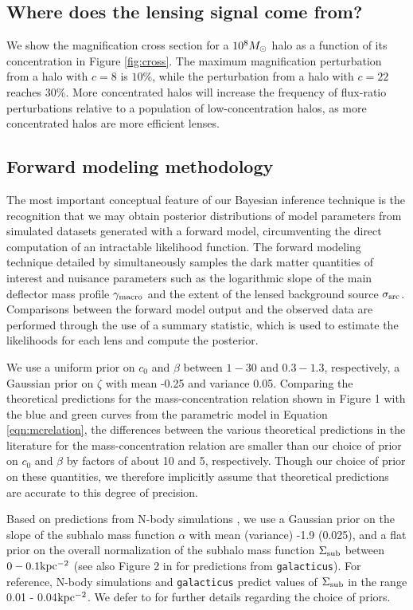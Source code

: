 \subsection{Where does the lensing signal come from?}

We show the magnification cross section for a $10^{8} {M_{\odot}}$ halo as a function of its concentration in Figure \ref{fig:cross}. The maximum magnification perturbation from a halo with $c=8$ is $10\%$, while the perturbation from a halo with $c = 22$ reaches $30 \%$. More concentrated halos will increase the frequency of flux-ratio perturbations relative to a population of low-concentration halos, as more concentrated halos are more efficient lenses. 

\subsection{Forward modeling methodology}
The most important conceptual feature of our Bayesian inference technique is the recognition that we may obtain posterior distributions of model parameters from simulated datasets generated with a forward model, circumventing the direct computation of an intractable likelihood function. The forward modeling technique detailed by \cite{Gilman++19b} simultaneously samples the dark matter quantities of interest and nuisance parameters such as the logarithmic slope of the main deflector mass profile $\gamma_{\rm{macro}}$ and the extent of the lensed background source $\sigma_{\rm{src}}$. Comparisons between the forward model output and the observed data are performed through the use of a summary statistic, which is used to estimate the likelihoods for each lens and compute the posterior. 

We use a uniform prior on $c_0$ and $\beta$ between $1 - 30$ and $0.3 - 1.3$, respectively, a Gaussian prior on $\zeta$ with mean -0.25 and variance 0.05. Comparing the theoretical predictions for the mass-concentration relation shown in Figure 1 with the blue and green curves from the parametric model in Equation \ref{eqn:mcrelation}, the differences between the various theoretical predictions in the literature for the mass-concentration relation are smaller than our choice of prior on $c_0$ and $\beta$ by factors of about 10 and 5, respectively. Though our choice of prior on these quantities, we therefore implicitly assume that theoretical predictions are accurate to this degree of precision. 

Based on predictions from N-body simulations \cite{Springel++08,Fiacconi++16}, we use a Gaussian prior on the slope of the subhalo mass function $\alpha$ with mean (variance) -1.9 (0.025), and a flat prior on the overall normalization of the subhalo mass function $\Sigma_{\rm{sub}}$ between $0 - 0.1 \rm{kpc^{-2}}$ (see also Figure 2 in \cite{Gilman++19b} for predictions from {\tt{galacticus}}). For reference, N-body simulations and {\tt{galacticus}} predict values of $\Sigma_{\rm{sub}}$ in the range 0.01 - 0.04$\rm{kpc^{-2}}$. We defer to \cite{Gilman++19b} for further details regarding the choice of priors.

